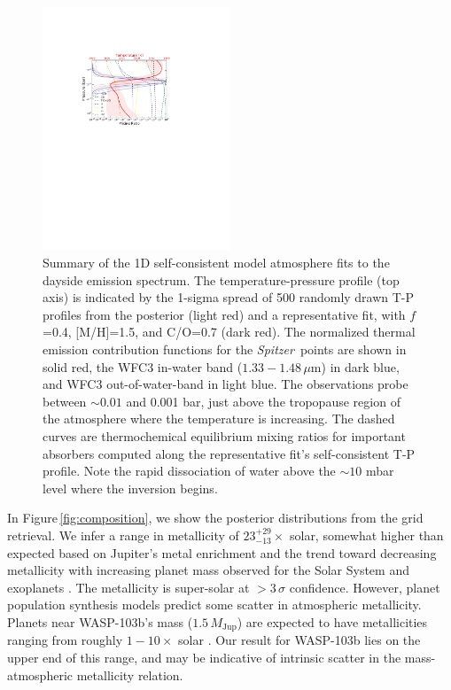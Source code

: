 \documentclass[twocolumn, trackchanges]{aastex61}
\newcommand{\project}[1]{\textsl{#1}}
\newcommand{\Spitzer}{\project{Spitzer}}
\begin{document}
\begin{figure}
\includegraphics[width = 0.5\textwidth]{fig12.pdf}
\caption{Summary of the 1D self-consistent model atmosphere fits to the dayside emission spectrum.  The temperature-pressure profile (top axis) is indicated by the 1-sigma spread of 500 randomly drawn T-P profiles from the posterior (light red) and a representative fit, with $f$=0.4, [M/H]=1.5, and C/O=0.7 (dark red).  The normalized thermal emission contribution functions for the \Spitzer\ points are shown in solid red, the WFC3 in-water band ($1.33-1.48\,\mu$m) in dark blue, and WFC3 out-of-water-band in light blue.  The observations probe between $\sim0.01$ and 0.001 bar, just above the tropopause region of the atmosphere where the temperature is increasing.  The dashed curves are thermochemical equilibrium mixing ratios for important absorbers computed along the representative fit's self-consistent T-P profile.  Note the rapid dissociation of water above the $\sim10$ mbar level where the inversion begins.}
\label{fig:summary}
\end{figure}

In Figure\,\ref{fig:composition}, we show the posterior distributions from the grid retrieval.  We infer a range in metallicity of $23^{+29}_{-13}\times$ solar, somewhat higher than expected based on Jupiter's metal enrichment \citep[$3-5\times$ solar;][]{wong04} and the trend toward decreasing metallicity with increasing planet mass observed for the Solar System and exoplanets \cite[e.g.][]{kreidberg14b}.  The metallicity is super-solar at $>3\,\sigma$ confidence. However, planet population synthesis models predict some scatter in atmospheric metallicity. Planets near WASP-103b's mass ($1.5\,M_\mathrm{Jup}$) are expected to have metallicities ranging from roughly $1-10\times$ solar \citep{fortney13, mordasini16}. Our result for WASP-103b lies on the upper end of this range, and may be indicative of intrinsic scatter in the mass-atmospheric metallicity relation. 
\end{document}
